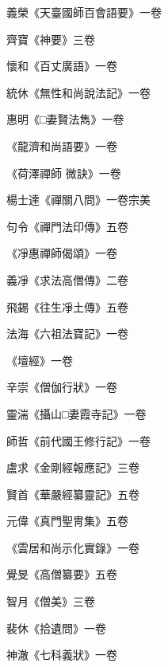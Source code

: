 \begin{pinyinscope}
 義榮《天臺國師百會語要》一卷



 齊寶《神要》三卷



 懷和《百丈廣語》一卷



 統休《無性和尚說法記》一卷



 惠明《□妻賢法雋》一卷



 《龍濟和尚語要》一卷



 《荷澤禪師
 微訣》一卷



 楊士達《禪關八問》一卷宗美



 句令《禪門法印傳》五卷



 《凈惠禪師偈頌》一卷



 義凈《求法高僧傳》二卷



 飛錫《往生凈土傳》五卷



 法海《六祖法寶記》一卷



 《壇經》一卷



 辛崇《僧伽行狀》一卷



 靈湍《攝山□妻霞寺記》一卷



 師哲《前代國王修行記》一卷



 盧求《金剛經報應記》三卷



 賢首《華嚴經纂靈記》五卷



 元偉《真門聖冑集》五卷



 《雲居和尚示化實錄》一卷



 覺旻《高僧纂要》五卷



 智月《僧美》三卷



 裴休《拾遺問》一卷



 神澈《七科義狀》一卷




\end{pinyinscope}
